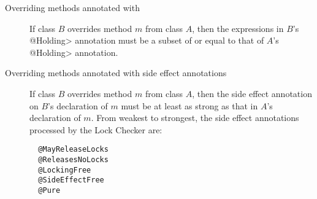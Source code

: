 \begin{description}

\item[Overriding methods annotated with ]
  If class $B$ overrides method $m$ from class $A$, then the expressions in
  $B$'s \<@Holding>
  annotation must be a subset of or equal to that of $A$'s \<@Holding>
  annotation.

\item[Overriding methods annotated with side effect annotations]
  If class $B$ overrides method $m$ from class $A$, then
  the side effect annotation on $B$'s declaration of $m$
  must be at least as strong as that in $A$'s declaration of $m$.
  From weakest to strongest, the side effect annotations
  processed by the Lock Checker are:
\begin{verbatim}
  @MayReleaseLocks
  @ReleasesNoLocks
  @LockingFree
  @SideEffectFree
  @Pure
\end{verbatim}

\end{description}


